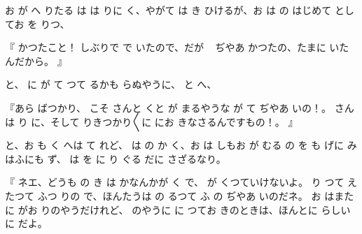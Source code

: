 お
が
へ
りたる
は
は
りに
く、やがて
は
き
ひけるが、お
は
の
はじめて
としてお
を
りつ、

『
かつたこと！
しぶりで
で
いたので、だが
\ %
ぢやあ
かつたの、たまに
いたんだから。
』

と、
に
が
て
つて
るかも
らぬやうに、
と
へ、

『あら
ばつかり、
こそ
さんと
くと
が
まるやうな
が
て
ぢやあ
いの！。
さんは
り
に、そして
りきつかり〳〵に
にお
きなさるんですもの！。
』

と、お
も
く
へは
て
れど、
は
の
か
く、お
は
しもお
が
むる
の
を
も
げに
み
はふにも
ず、
は
を
に
り
ぐる
だに
さざるなり。

『
ネエ、どうも
の
き
は
かなんかが
く
で、
が
くつていけないよ。
り
つて
えたつて
ふつ
りの
で、ほんたうは
の
るつて
ふ
の
ぢやあ
いのだネ。
お
はまた
に
がお
りのやうだけれど、
のやうに
に
つてお
きのときは、ほんとに
らしい
に
だよ。

